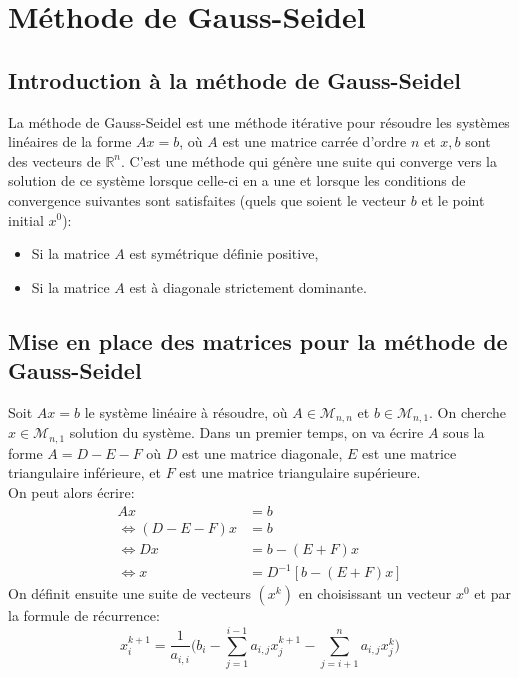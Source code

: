 \documentclass{report}
\begin{document}
\lstset{
  firstnumber=0, 
  numbers=left,               
  frame=single,
  language=C,                                       
  showstringspaces=false
}
\section{Méthode de Gauss-Seidel}
\subsection{Introduction à la méthode de Gauss-Seidel}
La méthode de Gauss-Seidel est une méthode itérative pour résoudre 
les systèmes linéaires de la forme $Ax=b$, où $A$ est une matrice carrée d'ordre $n$ et $x, b$ sont des vecteurs de $\mathbb{R}^n$. 
C'est une méthode qui génère 
une suite qui converge vers la solution de ce système lorsque celle-ci en a une et lorsque les conditions de convergence suivantes sont satisfaites (quels que soient le vecteur $b$ et le point initial $x^0$):
\begin{itemize}
  \item Si la matrice $A$ est symétrique définie positive,
  \item Si la matrice $A$ est à diagonale strictement dominante.
\end{itemize}
\subsection{Mise en place des matrices pour la méthode de Gauss-Seidel}\label{decompMatrice}
Soit $Ax=b$ le système linéaire à résoudre, où $A\in \mathcal{M}_{n,n}$ et $b\in  \mathcal{M}_{n,1}$. On cherche $x\in \mathcal{M}_{n,1}$ solution du système.
Dans un premier temps, on va écrire $A$ sous la forme $A=D-E-F$ où $D$ est une matrice diagonale, $E$ est une matrice triangulaire inférieure, et $F$ est une matrice triangulaire supérieure. \\
On peut alors écrire:
\begin{align}
  Ax&=b \\
  \Leftrightarrow  (D-E-F)x&=b \\
  \Leftrightarrow  Dx&=b-(E+F)x \\
  \Leftrightarrow  x&=D^{-1}[b-(E+F)x]
\end{align}
On définit ensuite une suite de vecteurs $(x^k)$ en choisissant un vecteur $x^0$ et par la formule de récurrence:\\
\begin{equation}
  x_i^{k+1}=\frac{1}{a_{i,i}}\Bigg(b_i-\sum \limits_{j = 1}^{i-1}a_{i,j}x_{j}^{k+1} - \sum \limits_{j = i+1}^{n}a_{i,j}x_{j}^{k}\Bigg)
\end{equation}
\end{document}

